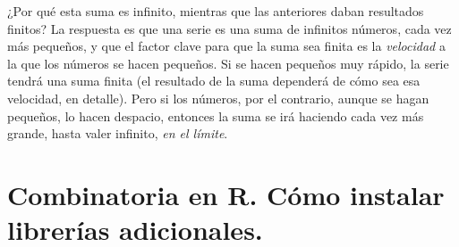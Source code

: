 \documentclass[10pt,a4paper]{article}\usepackage[]{graphicx}\usepackage[]{color}
\newcounter {cont01}
\begin{document}
¿Por qué esta suma es infinito, mientras que las anteriores daban resultados finitos? La respuesta es que una serie es una suma de infinitos números,
cada vez más pequeños, y que el factor clave para que la suma sea finita es la {\em velocidad} a la que los números se hacen pequeños. Si se hacen
pequeños muy rápido,  la serie tendrá una suma finita (el resultado de la suma dependerá de cómo sea esa velocidad, en detalle). Pero si los números,
por el contrario, aunque se hagan pequeños, lo hacen despacio, entonces la suma se irá haciendo cada vez más grande, hasta valer infinito, {\em en el límite}.


\section{Combinatoria en R. Cómo instalar librerías adicionales.}
\label{tut03:sec:CombinatoriaR}
\end{document}
